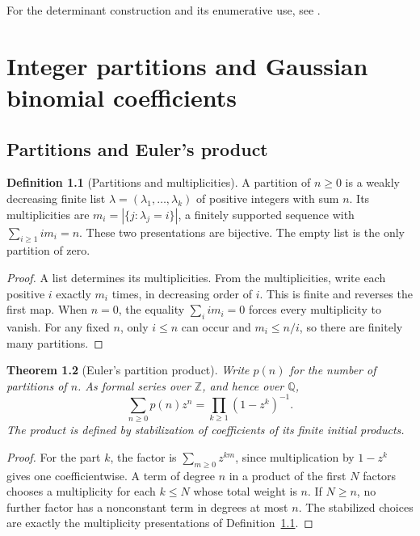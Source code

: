 \documentclass[11pt,oneside,openany]{book}
\theoremstyle{plain}
\newtheorem{theorem}{Theorem}[chapter]
\theoremstyle{definition}
\newtheorem{definition}[theorem]{Definition}
\theoremstyle{remark}
\begin{document}
For the determinant construction and its enumerative use,
see \cite{LGV}.
\chapter[Partitions and Gaussian coefficients]{Integer partitions and Gaussian binomial coefficients}
\label{p204:ch04}

\section{Partitions and Euler's product}

\begin{definition}[Partitions and multiplicities]\label{p204:W24}
A partition of \(n\ge0\) is a weakly decreasing finite list
\(\lambda=(\lambda_1,\ldots,\lambda_k)\) of positive integers
with sum \(n\). Its multiplicities are
\(m_i=|\{j:\lambda_j=i\}|\), a finitely supported sequence with
\(\sum_{i\ge1} i m_i=n\).
These two presentations are bijective. The empty list is the
only partition of zero.
\end{definition}
\begin{proof}
A list determines its multiplicities. From the multiplicities,
write each positive \(i\) exactly \(m_i\) times, in decreasing
order of \(i\). This is finite and reverses the first map.
When \(n=0\), the equality \(\sum_i i m_i=0\) forces every
multiplicity to vanish. For any fixed \(n\), only \(i\le n\)
can occur and \(m_i\le n/i\), so there are finitely many partitions.
\end{proof}

\begin{theorem}[Euler's partition product]\label{p204:W25}
Write \(p(n)\) for the number of partitions of \(n\). As formal
series over \(\mathbb Z\), and hence over \(\mathbb Q\),
\[
 \sum_{n\ge0}p(n)z^n=\prod_{k\ge1}(1-z^k)^{-1}.
\]
The product is defined by stabilization of coefficients of its
finite initial products.
\end{theorem}
\begin{proof}
For the part \(k\), the factor is
\(\sum_{m\ge0}z^{km}\), since multiplication by \(1-z^k\)
gives one coefficientwise. A term of degree \(n\) in a product
of the first \(N\) factors chooses a multiplicity for each
\(k\le N\) whose total weight is \(n\). If \(N\ge n\), no
further factor has a nonconstant term in degrees at most \(n\).
The stabilized choices are exactly the multiplicity presentations
of Definition~\ref{p204:W24}.
\end{proof}
\end{document}
